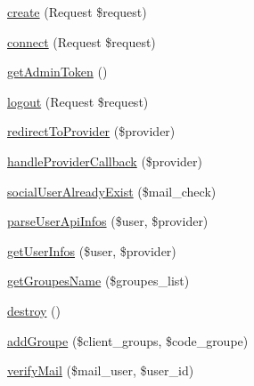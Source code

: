 \begin{DoxyCompactItemize}
\item 
\mbox{\hyperlink{class_app_1_1_http_1_1_controllers_1_1_user_informations_controller_a14e082d8e6a6a1e8dea28f9d0267fdf0}{create}} (Request \$request)
\item 
\mbox{\hyperlink{class_app_1_1_http_1_1_controllers_1_1_user_informations_controller_a0cd14581b8643d7ebc165e33c908ba01}{connect}} (Request \$request)
\item 
\mbox{\hyperlink{class_app_1_1_http_1_1_controllers_1_1_user_informations_controller_a5de8ef8db154f145e2624be4cb9dd941}{get\+Admin\+Token}} ()
\item 
\mbox{\hyperlink{class_app_1_1_http_1_1_controllers_1_1_user_informations_controller_a5b2715b64f1825c3c1e3a92ee2b695fc}{logout}} (Request \$request)
\item 
\mbox{\hyperlink{class_app_1_1_http_1_1_controllers_1_1_user_informations_controller_a4d0667bc9789343654766a185e227160}{redirect\+To\+Provider}} (\$provider)
\item 
\mbox{\hyperlink{class_app_1_1_http_1_1_controllers_1_1_user_informations_controller_a0f8077b430eafc1d92b491ebf2aa3afa}{handle\+Provider\+Callback}} (\$provider)
\item 
\mbox{\hyperlink{class_app_1_1_http_1_1_controllers_1_1_user_informations_controller_a2a4a6927238d79d0ddd3078189e53e43}{social\+User\+Already\+Exist}} (\$mail\+\_\+check)
\item 
\mbox{\hyperlink{class_app_1_1_http_1_1_controllers_1_1_user_informations_controller_a7c8031af5e576afada6cf4b5304afff8}{parse\+User\+Api\+Infos}} (\$user, \$provider)
\item 
\mbox{\hyperlink{class_app_1_1_http_1_1_controllers_1_1_user_informations_controller_a0e00dbd60c714a125961bd48e41aa365}{get\+User\+Infos}} (\$user, \$provider)
\item 
\mbox{\hyperlink{class_app_1_1_http_1_1_controllers_1_1_user_informations_controller_a4cb22c3a4eb70b9af1297aaee86ddbf7}{get\+Groupes\+Name}} (\$groupes\+\_\+list)
\item 
\mbox{\hyperlink{class_app_1_1_http_1_1_controllers_1_1_user_informations_controller_aa118461de946085fe42989193337044a}{destroy}} ()
\item 
\mbox{\hyperlink{class_app_1_1_http_1_1_controllers_1_1_user_informations_controller_a38b277de903fd5b16def1c1071d34474}{add\+Groupe}} (\$client\+\_\+groups, \$code\+\_\+groupe)
\item 
\mbox{\hyperlink{class_app_1_1_http_1_1_controllers_1_1_user_informations_controller_aa1af9f084604603a905875d6c57adb24}{verify\+Mail}} (\$mail\+\_\+user, \$user\+\_\+id)

\end{DoxyCompactItemize}
